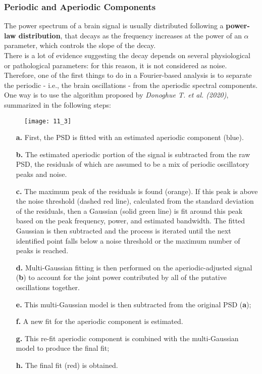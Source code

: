 \subsubsection{Periodic and Aperiodic Components}
The power spectrum of a brain signal is usually distributed following a \textbf{power-law distribution},
that decays as the frequency increases at the power of an \(\alpha\) parameter, which controls the slope
of the decay.\\
There is a lot of evidence suggesting the decay depends on several physiological or pathological parameters:
for this reason, it is not considered as noise.\\
Therefore, one of the first things to do in a Fourier-based analysis is to separate the periodic
- i.e., the brain oscillations - from the aperiodic spectral components. One way is to use the
algorithm proposed by \textit{Donoghue T. et al. (2020)}, summarized in the following steps:
\begin{figure}[H]
    \texttt{[image: 11\_3]}
    \centering
\end{figure}
\begin{itemize}
    \item[\textbf{a.}] First, the PSD is fitted with an estimated aperiodic component (blue).
    \item[\textbf{b.}] The estimated aperiodic portion of the signal is subtracted from the raw PSD, the
        residuals of which are assumed to be a mix of periodic oscillatory peaks and noise.
    \item[\textbf{c.}] The maximum peak of the residuals is found (orange). If this peak is above the noise
        threshold (dashed red line), calculated from the standard deviation of the residuals, then a Gaussian
        (solid green line) is fit around this peak based on the peak frequency, power, and estimated bandwidth.
        The fitted Gaussian is then subtracted and the process is iterated until the next identified point
        falls below a noise threshold or the maximum number of peaks is reached.
    \item[\textbf{d.}] Multi-Gaussian fitting is then performed on the aperiodic-adjusted signal (\textbf{b})
        to account for the joint power contributed by all of the putative oscillations together.
    \item[\textbf{e.}] This multi-Gaussian model is then subtracted from the original PSD (\textbf{a});
    \item[\textbf{f.}] A new fit for the aperiodic component is estimated.
    \item[\textbf{g.}] This re-fit aperiodic component is combined with the multi-Gaussian model to produce
        the final fit;
    \item[\textbf{h.}] The final fit (red) is obtained.
\end{itemize}
